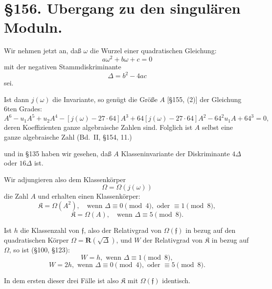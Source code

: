 \documentclass[12pt,a4paper]{article}
\begin{document}
\section*{\S 156. Ubergang zu den singul\"aren Moduln.}

Wir nehmen jetzt an, da\ss{} $\omega$ die Wurzel einer quadratischen Gleichung:
\begin{equation}a\omega^2 + b\omega + c = 0\end{equation}
mit der negativen Stammdiskriminante
\begin{equation}\Delta = b^2 - 4ac\end{equation}
sei.

Ist dann $j(\omega)$ die Invariante, so gen\"ugt die Gr\"o\ss{}e $A$ [\S 155, (2)] der Gleichung 6ten Grades:
\begin{equation}A^6 - u_1 A^5 + u_2 A^4 - [j(\omega) - 27 \cdot 64] A^3 + 64 [j(\omega) - 27 \cdot 64] A^2 - 64^2 u_1 A + 64^3 = 0,\end{equation}
deren Koeffizienten ganze algebraische Zahlen sind. Folglich ist $A$ selbst eine ganze algebraische Zahl (Bd.~II, \S 154, 11.)

und in \S 135 haben wir gesehen, da\ss{} $A$ Klasseninvariante der Diskriminante $4\Delta$ oder $16\Delta$ ist.

Wir adjungieren also dem Klassenk\"orper
\begin{equation}\Omega = \Omega(j(\omega))\end{equation}
die Zahl $A$ und erhalten einen Klassenk\"orper:
\begin{equation}\mathfrak{K} = \Omega(A^2), \quad \text{wenn } \Delta \equiv 0 \pmod{4}, \text{ oder } \equiv 1 \pmod{8},\end{equation}
\[\mathfrak{K} = \Omega(A), \quad \text{wenn } \Delta \equiv 5 \pmod{8}.\]

Ist $h$ die Klassenzahl von $\mathfrak{f}$, also der Relativgrad von $\Omega(\mathfrak{f})$ in bezug auf den quadratischen K\"orper $\Omega = \mathbf{R}(\sqrt{\Delta})$, und $W$ der Relativgrad von $\mathfrak{K}$ in bezug auf $\Omega$, so ist (\S 100, \S 123):
\begin{equation}W = h, \text{ wenn } \Delta \equiv 1 \pmod{8},\end{equation}
\[W = 2h, \text{ wenn } \Delta \equiv 0 \pmod{4}, \text{ oder } \equiv 5 \pmod{8}.\]

In dem ersten dieser drei F\"alle ist also $\mathfrak{K}$ mit $\Omega(\mathfrak{f})$ identisch.
\end{document}
